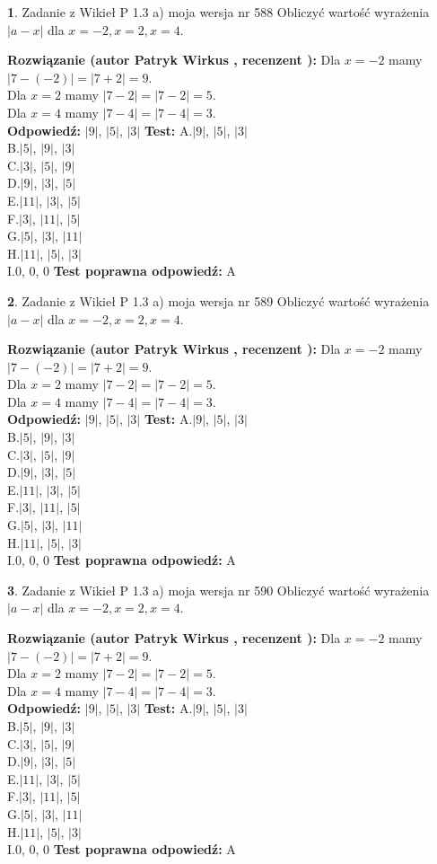 \documentclass[12pt, a4paper]{article}
\theoremstyle{definition} %
\newtheorem{zad}{}
\newcommand{\zadStart}[1]{\begin{zad}#1\newline}
\newcommand{\zadStop}{\end{zad}}
\newcommand{\rozwStart}[2]{\noindent \textbf{Rozwiązanie (autor #1 , recenzent #2): }\newline}
\newcommand{\rozwStop}{\newline}
\newcommand{\odpStart}{\noindent \textbf{Odpowiedź:}\newline}
\newcommand{\odpStop}{\newline}
\newcommand{\testStart}{\noindent \textbf{Test:}\newline}
\newcommand{\testStop}{\newline}
\newcommand{\kluczStart}{\noindent \textbf{Test poprawna odpowiedź:}\newline}
\newcommand{\kluczStop}{\newline}
\begin{document}
\zadStart{Zadanie z Wikieł P 1.3 a) moja wersja nr 588}
Obliczyć wartość wyrażenia $|a - x|$ dla $x=-2,x=2,x=4$.
\zadStop
\rozwStart{Patryk Wirkus}{}
Dla $x = -2$ mamy $|7 - (-2)| = |7 + 2| = 9$.\\
Dla $x = 2$ mamy $|7 - 2| = |7 - 2| = 5$.\\
Dla $x = 4$ mamy $|7 - 4| = |7 - 4| = 3$.\\
\rozwStop
\odpStart
$|9|$, $|5|$, $|3|$
\odpStop
\testStart
A.$|9|$, $|5|$, $|3|$\\
B.$|5|$, $|9|$, $|3|$\\
C.$|3|$, $|5|$, $|9|$\\
D.$|9|$, $|3|$, $|5|$\\
E.$|11|$, $|3|$, $|5|$\\
F.$|3|$, $|11|$, $|5|$\\
G.$|5|$, $|3|$, $|11|$\\
H.$|11|$, $|5|$, $|3|$\\
I.$0$, $0$, $0$
\testStop
\kluczStart
A
\kluczStop



\zadStart{Zadanie z Wikieł P 1.3 a) moja wersja nr 589}
Obliczyć wartość wyrażenia $|a - x|$ dla $x=-2,x=2,x=4$.
\zadStop
\rozwStart{Patryk Wirkus}{}
Dla $x = -2$ mamy $|7 - (-2)| = |7 + 2| = 9$.\\
Dla $x = 2$ mamy $|7 - 2| = |7 - 2| = 5$.\\
Dla $x = 4$ mamy $|7 - 4| = |7 - 4| = 3$.\\
\rozwStop
\odpStart
$|9|$, $|5|$, $|3|$
\odpStop
\testStart
A.$|9|$, $|5|$, $|3|$\\
B.$|5|$, $|9|$, $|3|$\\
C.$|3|$, $|5|$, $|9|$\\
D.$|9|$, $|3|$, $|5|$\\
E.$|11|$, $|3|$, $|5|$\\
F.$|3|$, $|11|$, $|5|$\\
G.$|5|$, $|3|$, $|11|$\\
H.$|11|$, $|5|$, $|3|$\\
I.$0$, $0$, $0$
\testStop
\kluczStart
A
\kluczStop



\zadStart{Zadanie z Wikieł P 1.3 a) moja wersja nr 590}
Obliczyć wartość wyrażenia $|a - x|$ dla $x=-2,x=2,x=4$.
\zadStop
\rozwStart{Patryk Wirkus}{}
Dla $x = -2$ mamy $|7 - (-2)| = |7 + 2| = 9$.\\
Dla $x = 2$ mamy $|7 - 2| = |7 - 2| = 5$.\\
Dla $x = 4$ mamy $|7 - 4| = |7 - 4| = 3$.\\
\rozwStop
\odpStart
$|9|$, $|5|$, $|3|$
\odpStop
\testStart
A.$|9|$, $|5|$, $|3|$\\
B.$|5|$, $|9|$, $|3|$\\
C.$|3|$, $|5|$, $|9|$\\
D.$|9|$, $|3|$, $|5|$\\
E.$|11|$, $|3|$, $|5|$\\
F.$|3|$, $|11|$, $|5|$\\
G.$|5|$, $|3|$, $|11|$\\
H.$|11|$, $|5|$, $|3|$\\
I.$0$, $0$, $0$
\testStop
\kluczStart
A
\kluczStop
\end{document}
